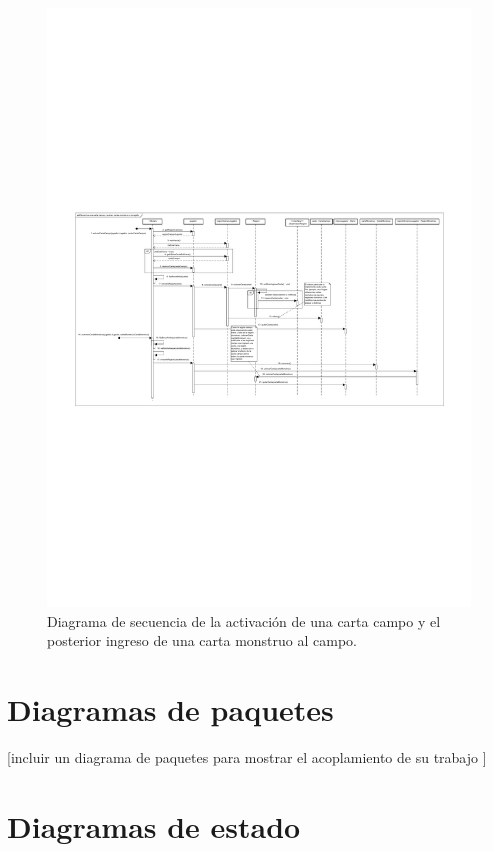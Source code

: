 \begin{figure}[H]
	\centering
	\includegraphics[scale=0.9]{includes/seq_Se_activa_una_carta_campo_y_entran_cartas_monstruo_a_la_region}
	\caption{Diagrama de secuencia de la activación de una carta campo y el posterior ingreso de una carta monstruo al campo.}
	\label{seq_Se_activa_una_carta_campo_y_entran_cartas_monstruo_a_la_region}
\end{figure}

\section{Diagramas de paquetes}

[incluir un diagrama de paquetes para mostrar el acoplamiento de su
trabajo ]

\section{Diagramas de estado}

